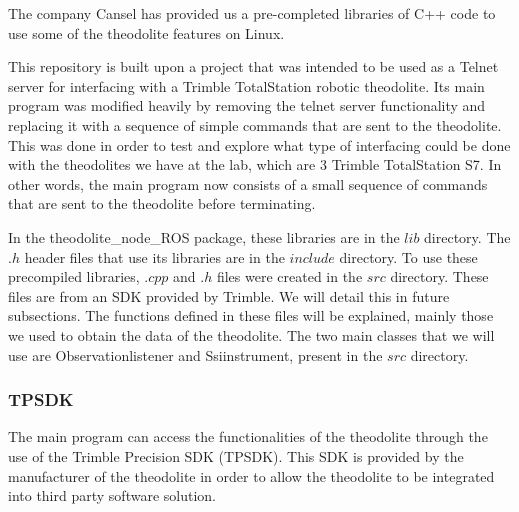 \documentclass[10pt,letterpaper,oneside]{article}
\begin{document}
The company Cansel has provided us a pre-completed libraries of C++ code to use some of the theodolite features on Linux.

This repository is built upon a project that was intended to be used as a Telnet server for interfacing with a Trimble TotalStation robotic theodolite. 
Its main program was modified heavily by removing the telnet server functionality and replacing it with a sequence of simple commands that are sent to the theodolite. 
This was done in order to test and explore what type of interfacing could be done with the theodolites we have at the lab, which are 3 Trimble TotalStation S7. 
In other words, the main program now consists of a small sequence of commands that are sent to the theodolite before terminating.


In the theodolite\_node\_ROS package, these libraries are in the $lib$ directory.
The $.h$ header files that use its libraries are in the $include$ directory.
To use these precompiled libraries, $.cpp$ and $.h$ files were created in the $src$ directory.
These files are from an SDK provided by Trimble.
We will detail this in future subsections.
The functions defined in these files will be explained, mainly those we used to obtain the data of the theodolite.
The two main classes that we will use are Observationlistener and Ssiinstrument, present in the $src$ directory.


\subsubsection{TPSDK}

The main program can access the functionalities of the theodolite through the use of the Trimble Precision SDK (TPSDK). 
This SDK is provided by the manufacturer of the theodolite in order to allow the theodolite to be integrated into third party software solution.
\end{document}

